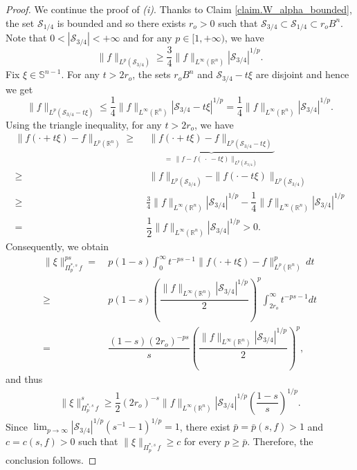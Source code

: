 \documentclass[11pt, reqno]{article}
\theoremstyle{definition}
\numberwithin{equation}{section}
\newcommand{\R}{\mathbb{R}}
\newcommand{\Sphere}{\mathbb{S}^{n - 1}}
\newcommand{\Sset}{\mathscr S}
\begin{document}
\begin{proof}
	We continue the proof of \textit{(i)}.
    Thanks to Claim \ref{claim.W_alpha_bounded}, the set $\Sset_{1/4}$ is bounded and so there exists $r_o > 0$ such that $\Sset_{3/4} \subset \Sset_{1/4} \subset r_o B^n$.
	Note that $0 < |\Sset_{3/4}| < + \infty$ and for any $p \in [1, + \infty)$, we have 
	\[
	\| f \|_{L^p(\Sset_{3/4})} \geq \frac{3}{4} \| f \|_{L^\infty(\R^n)} |\Sset_{3/4}|^{1/p}.
	\]
	Fix $\xi \in \Sphere$.
    For any $t > 2r_o$, the sets $r_oB^n$ and $\Sset_{3/4} - t\xi$ are disjoint and hence we get 
    \[
    	\| f \|_{L^p(\Sset_{3/4} - t \xi)} \leq \dfrac{1}{4} \| f \|_{L^\infty(\R^n)} |\Sset_{3/4} - t\xi|^{1/p} = \dfrac{1}{4} \| f \|_{L^\infty(\R^n)} |\Sset_{3/4}|^{1/p}.
    \]
    Using the triangle inequality, for any $t > 2r_o$, we have
    \begin{equation}\label{differ-Lp}
    	\begin{split}
    	\| f(\cdot + t \xi) - f \|_{L^p(\R^n)} 
    	\geq &  ~ 
    	~ \underbrace{\| f(\cdot + t \xi) - f \|_{L^p(\Sset_{3/4} - t\xi)}}_{= \, \| f   - f(~\cdot ~- t \xi) \|_{L^p(\Sset_{3/4})}} \\
    	\geq & ~ 
    	~ \| f \|_{L^p(\Sset_{3/4})} - \| f (\cdot - t \xi) \|_{L^p(\Sset_{3/4})} \\
    	\geq & ~
	\frac{3}{4} \| f \|_{L^\infty(\R^n)} |\Sset_{3/4}|^{1/p} - \dfrac{1}{4} \| f \|_{L^\infty(\R^n)} |\Sset_{3/4}|^{1/p} \\
    = & ~  \dfrac{1}{2}\| f \|_{L^\infty(\R^n)} |\Sset_{3/4}|^{1/p} > 0.
    	\end{split}
    \end{equation}
    Consequently, we obtain
    \begin{align*}
    	 \| \xi \|^{ps}_{\Pi^{\ast, s}_p \, f} 
         = & ~  p(1 - s) \int_0^\infty t^{-ps - 1} \| f(\cdot + t\xi) - f \|^p_{L^p(\R^n)} \, dt \\
    	 \geq & 
    	 ~ p(1 - s) \left( \dfrac{\| f \|_{L^\infty(\R^n)} |\Sset_{3/4}|^{1/p}}{2}  \right)^p \int_{2r_o}^\infty t^{-ps - 1}dt \\
    	 = & 
    	 ~ \dfrac{(1 - s)(2r_o)^{-ps}}{s}  \left( \dfrac{\| f \|_{L^\infty(\R^n)} |\Sset_{3/4}|^{1/p}}{2}  \right)^p,
    \end{align*}
   	and thus
   	\begin{align*}
   		\| \xi \|^{s}_{\Pi^{\ast, s}_p \, f} \geq \dfrac{1}{2} (2r_o)^{-s}\| f \|_{L^\infty(\R^n)} |\Sset_{3/4}|^{1/p} \left( \dfrac{1 - s}{s} \right)^{1/p}.
   	\end{align*}
 Since $\textstyle\lim_{p \to \infty} |\Sset_{3/4}|^{1/p}(s^{-1} - 1)^{1/p} = 1$, there exist $\bar p  = \bar p(s, f) > 1$ and $c = c(s, f) > 0$ such that $\| \xi \|_{\Pi^{\ast, s}_p \, f} \geq c$ for every $p \geq \bar p$. 
 Therefore, the conclusion follows.
   

\end{proof}
\end{document}
